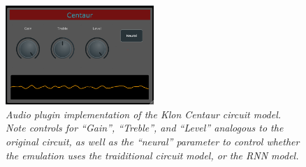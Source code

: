 \documentclass[twoside,a4paper]{article}
\begin{document}
\begin{figure}
    \centering
    \includegraphics[width=0.5\textwidth]{Plugin.png}
    \caption{\label{fig:Plugin} {\it Audio plugin implementation
    of the Klon Centaur circuit model. Note controls for ``Gain'',
    ``Treble'', and ``Level'' analogous to the original circuit,
    as well as the ``neural'' parameter to control whether the
    emulation uses the traiditional circuit model, or the RNN model.}}
\end{figure}
\end{document}

